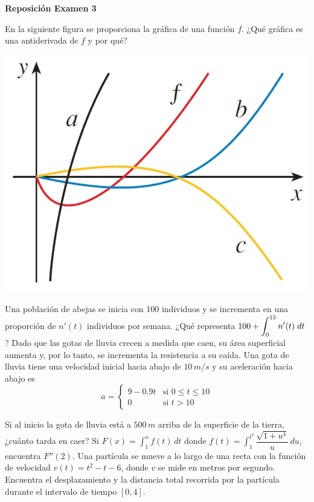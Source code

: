 \documentclass[12pt]{exam}
\begin{document}
\newpage

\begin{center}
\Large 
\textbf{Reposición Examen 3}
\end{center}{}
\normalsize

\begin{questions}
    \question En la siguiente figura se proporciona la gráfica de una función $f$. ¿Qué gráfica es una antiderivada de $f$ y por qué?
    \begin{center}
      \includegraphics[scale=0.55]{curvas antiderivadas.jpg}   
    \end{center}
   
\vskip10pt

    \question Una población de abejas se inicia con 100 individuos y se incrementa en una proporción de $n'(t)$ individuos por semana. ¿Qué representa $100+\mathlarger{\int_0^{15}n'(t)\;dt}$?
    \vskip10pt
    \question Dado que las gotas de lluvia crecen a medida que caen, su área superficial aumenta y, por lo tanto, se incrementa la resistencia a su caída. Una gota de lluvia tiene una velocidad inicial hacia abajo de \(10\, m/s\) y su aceleración hacia abajo es
$$ a = \begin{cases} 9-0.9t & \text{si } 0\leq t \leq 10 \\0 & \text{si } t > 10\end{cases} $$

Si al inicio la gota de lluvia está a $500\, m$ arriba de la superficie de la tierra, ¿cuánto tarda en caer?
 \vskip12pt   
    \question Si $F(x)=\displaystyle \int_1^x f(t)\,dt$ donde $f(t)=\displaystyle \int_1^{t^2}\dfrac{\sqrt{1+u^4}}{u}\,du$, encuentra $F''(2)$.
\vskip12pt
\question Una partícula se mueve a lo largo de una recta con la función de velocidad $v(t)=t^2-t-6$, donde $v$ se mide en metros por segundo. Encuentra el desplazamiento y la distancia total recorrida por la partícula durante el intervalo de tiempo $[0,4]$.
    
    \end{questions}{}
\end{document}
